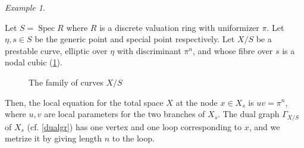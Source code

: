 \documentclass[a4paper,11pt]{amsart} %
\numberwithin{equation}{subsection}
\newcommand{\on}[1]{\operatorname{#1}}
\newcommand{\Spec}{\operatorname{Spec}}
\theoremstyle{definition}
\theoremstyle{plain}%
\theoremstyle{remark}
\newtheorem{example}[definition]{Example}
\begin{document}
\begin{example}\label{example:nonproper_pic_of_elliptic_degeneration}

    Let $S=\on{Spec} R$ where $R$ is a discrete valuation ring with uniformizer $\pi$. Let $\eta,s \in S$ be the generic point and special point respectively. Let $X/S$ be a prestable curve, elliptic over $\eta$ with discriminant $\pi^n$, and whose fibre over $s$ is a nodal cubic (\ref{nodalcu}). 

\begin{figure}[ht]
    \begin{center}

\end{center}
    \caption{The family of curves $X/S$}\label{nodalcu}
\end{figure}


    
    
    Then, the local equation for the total space $X$ at the node $x\in X_s$ is $uv=\pi^n$, where $u,v$ are local parameters for the two branches of $X_s$. The dual graph $\Gamma_{X/S}$ of $X_s$ (cf. \ref{dualgr}) has one vertex and one loop corresponding to $x$, and we metrize it by giving length $n$ to the loop.

    


\end{example}
\end{document}
